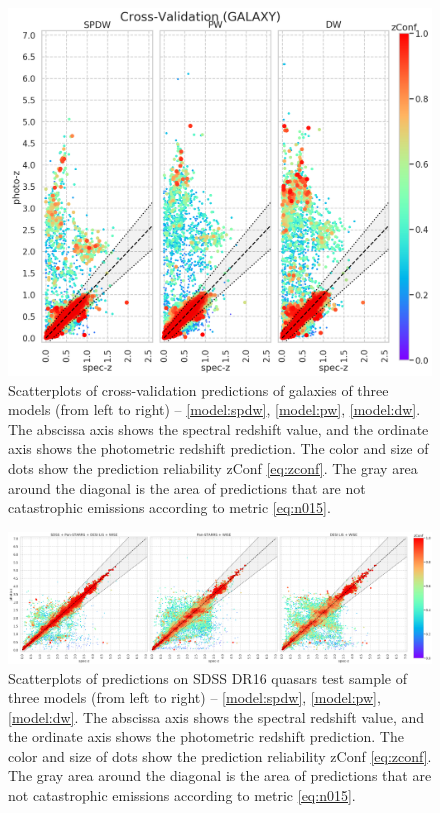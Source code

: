 \documentclass[fleqn,usenatbib]{mnras}
\begin{document}
\begin{figure}
    \centering
    \includegraphics[width=0.55\linewidth]{images/scatterplots-cv2-gal-sorted.png}
    \caption{Scatterplots of cross-validation predictions of galaxies of three models (from left to right) -- \ref{model:spdw}, \ref{model:pw}, \ref{model:dw}. The abscissa axis shows the spectral redshift value, and the ordinate axis shows the photometric redshift prediction. The color and size of dots show the prediction reliability zConf \eqref{eq:zconf}. The gray area around the diagonal is the area of predictions that are not catastrophic emissions according to metric \eqref{eq:n015}.}
    \label{fig:scatter-cv2-gal}
\end{figure}

\begin{figure}
    \centering
    \includegraphics[width=0.99\linewidth]{images/scatterplots-dr16q-wo-train-sorted.png}
    \caption{Scatterplots of predictions on SDSS DR16 quasars test sample of three models (from left to right) -- \ref{model:spdw}, \ref{model:pw}, \ref{model:dw}. The abscissa axis shows the spectral redshift value, and the ordinate axis shows the photometric redshift prediction. The color and size of dots show the prediction reliability zConf \eqref{eq:zconf}. The gray area around the diagonal is the area of predictions that are not catastrophic emissions according to metric \eqref{eq:n015}.}
    \label{fig:scatter-dr16q_wo_train}
\end{figure}
\end{document}
